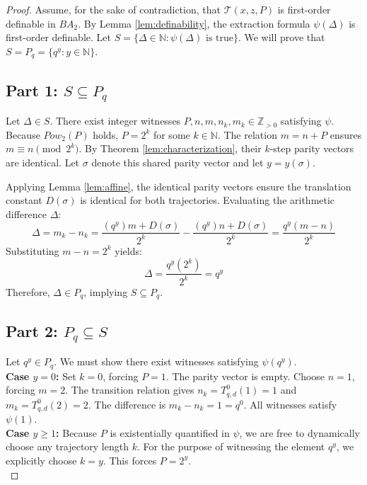 \documentclass[11pt]{article}
\begin{document}
\begin{proof}
Assume, for the sake of contradiction, that $\mathcal{T}(x, z, P)$ is first-order definable in $BA_2$. By Lemma \ref{lem:definability}, the extraction formula $\psi(\Delta)$ is first-order definable. Let $S = \{\Delta \in \mathbb{N} : \psi(\Delta) \text{ is true}\}$. We will prove that $S = P_q = \{q^y : y \in \mathbb{N}\}$.

\subsection*{Part 1: $S \subseteq P_q$}

Let $\Delta \in S$. There exist integer witnesses $P, n, m, n_k, m_k \in \mathbb{Z}_{>0}$ satisfying $\psi$. Because $Pow_2(P)$ holds, $P = 2^k$ for some $k \in \mathbb{N}$. The relation $m = n + P$ ensures $m \equiv n \pmod{2^k}$. By Theorem \ref{lem:characterization}, their $k$-step parity vectors are identical. Let $\sigma$ denote this shared parity vector and let $y=y(\sigma)$.

Applying Lemma \ref{lem:affine}, the identical parity vectors ensure the translation constant $D(\sigma)$ is identical for both trajectories. Evaluating the arithmetic difference $\Delta$:
$$ \Delta = m_k - n_k = \frac{(q^y)m + D(\sigma)}{2^k} - \frac{(q^y)n + D(\sigma)}{2^k} = \frac{q^y (m - n)}{2^k} $$
Substituting $m - n = 2^k$ yields:
$$ \Delta = \frac{q^y (2^k)}{2^k} = q^y $$
Therefore, $\Delta \in P_q$, implying $S \subseteq P_q$.

\subsection*{Part 2: $P_q \subseteq S$}

Let $q^y \in P_q$. We must show there exist witnesses satisfying $\psi(q^y)$. \\

\textbf{Case $y = 0$:} Set $k = 0$, forcing $P = 1$. The parity vector is empty. Choose $n = 1$, forcing $m = 2$. The transition relation gives $n_k = T_{q,d}^0(1) = 1$ and $m_k = T_{q,d}^0(2) = 2$. The difference is $m_k - n_k = 1 = q^0$. All witnesses satisfy $\psi(1)$. \\

\textbf{Case $y \ge 1$:} Because $P$ is existentially quantified in $\psi$, we are free to dynamically choose any trajectory length $k$. For the purpose of witnessing the element $q^y$, we explicitly choose $k = y$. This forces $P = 2^y$.  \\


\end{proof}
\end{document}
